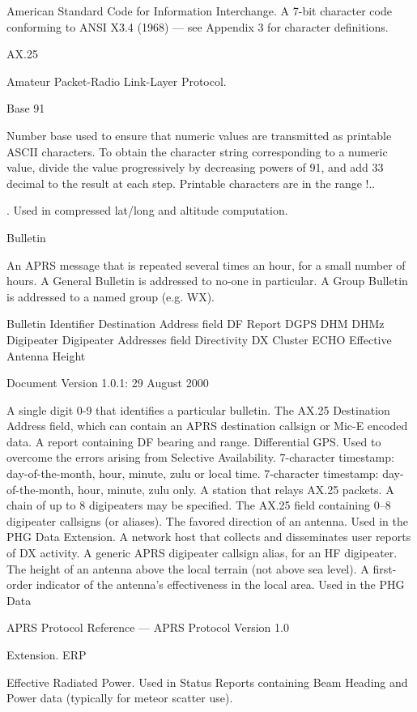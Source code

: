 American Standard Code for Information Interchange. A 7-bit character code
conforming to ANSI X3.4 (1968) — see Appendix 3 for character definitions.

AX.25

Amateur Packet-Radio Link-Layer Protocol.

Base 91

Number base used to ensure that numeric values are transmitted as printable ASCII
characters. To obtain the character string corresponding to a numeric value, divide the
value progressively by decreasing powers of 91, and add 33 decimal to the result at
each step. Printable characters are in the range !..{. Used in compressed lat/long and
altitude computation.

Bulletin

An APRS message that is repeated several times an hour, for a small number of
hours. A General Bulletin is addressed to no-one in particular. A Group Bulletin is
addressed to a named group (e.g. WX).

Bulletin Identifier
Destination Address field
DF Report
DGPS
DHM
DHMz
Digipeater
Digipeater Addresses field
Directivity
DX Cluster
ECHO
Effective Antenna Height

Document Version 1.0.1: 29 August 2000

A single digit 0-9 that identifies a particular bulletin.
The AX.25 Destination Address field, which can contain an APRS destination callsign
or Mic-E encoded data.
A report containing DF bearing and range.
Differential GPS. Used to overcome the errors arising from Selective Availability.
7-character timestamp: day-of-the-month, hour, minute, zulu or local time.
7-character timestamp: day-of-the-month, hour, minute, zulu only.
A station that relays AX.25 packets. A chain of up to 8 digipeaters may be specified.
The AX.25 field containing 0–8 digipeater callsigns (or aliases).
The favored direction of an antenna. Used in the PHG Data Extension.
A network host that collects and disseminates user reports of DX activity.
A generic APRS digipeater callsign alias, for an HF digipeater.
The height of an antenna above the local terrain (not above sea level). A first-order
indicator of the antenna’s effectiveness in the local area. Used in the PHG Data

APRS Protocol Reference — APRS Protocol Version 1.0



Extension.
ERP

Effective Radiated Power. Used in Status Reports containing Beam Heading and
Power data (typically for meteor scatter use).

}
